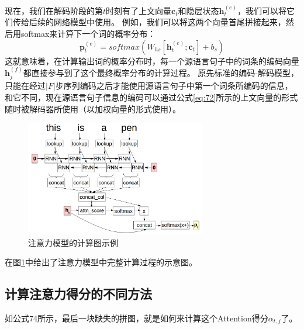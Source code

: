 \documentclass[10pt,a4paper]{ctexart}
\begin{document}
现在，我们在解码阶段的第$t$时刻有了上文向量$\textbf{c}_t$和隐层状态$\textbf{h}_t^{(e)}$，我们可以将它们传给后续的网络模型中使用。
例如，我们可以将这两个向量首尾拼接起来，然后用softmax来计算下一个词的概率分布：
\begin{equation}\label{eq:76}
 \textbf{p}_t^{(e)} = softmax(W_{hs}[\textbf{h}_t^{(e)};\textbf{c}_t] + b_s)
\end{equation}
这就意味着，在计算输出词的概率分布时，每一个源语言句子中的词条的编码向量$\textbf{h}_j^{(f)}$都直接参与到了这个最终概率分布的计算过程。
原先标准的编码-解码模型，只能在经过$|F|$步序列编码之后才能使用源语言句子中第一个词条所编码的信息，和它不同，现在源语言句子信息的编码可以通过公式\ref{eq:72}所示的上文向量的形式随时被解码器所使用（以加权向量的形式使用）。

\begin{figure}[H]
\centering
\includegraphics[width=0.7\textwidth]{fig28.png}
\caption{注意力模型的计算图示例}
\label{fig:28}
\end{figure}

在图\ref{fig:28}中给出了注意力模型中完整计算过程的示意图。

\subsection{计算注意力得分的不同方法}
如公式74所示，最后一块缺失的拼图，就是如何来计算这个Attention得分$\alpha_{t,j}$了。
\end{document}
